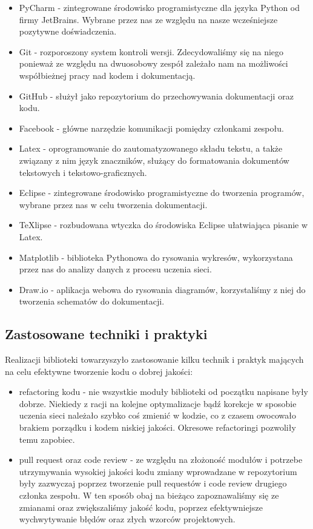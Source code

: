 \begin{itemize}
  \item PyCharm - zintegrowane środowisko programistyczne dla języka Python od firmy JetBrains.
  Wybrane przez nas ze względu na nasze wcześniejsze pozytywne doświadczenia.
  \item Git - rozporoszony system kontroli wersji. Zdecydowaliśmy się na niego ponieważ ze względu na 
  dwuosobowy zespół zależało nam na możliwości współbieżnej pracy nad kodem i dokumentacją.
  \item GitHub - służył jako repozytorium do przechowywania dokumentacji oraz kodu.
  \item Facebook - główne narzędzie komunikacji pomiędzy członkami zespołu.
  \item Latex - oprogramowanie do zautomatyzowanego składu tekstu, a także związany z nim język 
  znaczników, służący do formatowania dokumentów tekstowych i tekstowo-graficznych. 
  \item Eclipse - zintegrowane środowisko programistyczne do tworzenia programów, wybrane przez nas 
  w celu tworzenia dokumentacji.
  \item TeXlipse - rozbudowana wtyczka do środowiska Eclipse ułatwiająca pisanie w Latex.  
  \item Matplotlib - biblioteka Pythonowa do rysowania wykresów, wykorzystana przez nas do analizy danych 
  z procesu uczenia sieci. 
  \item Draw.io - aplikacja webowa do rysowania diagramów, korzystaliśmy z niej do tworzenia 
  schematów do dokumentacji.
\end{itemize}

\subsection{Zastosowane techniki i praktyki}
Realizacji biblioteki towarzyszyło zastosowanie kilku technik i praktyk mających na celu efektywne 
tworzenie kodu o dobrej jakości:
\begin{itemize}
  \item refactoring kodu - nie wszystkie moduły biblioteki od początku napisane były dobrze. Niekiedy z racji 
  na kolejne optymalizacje bądź korekcje w sposobie uczenia sieci należało szybko coś zmienić w kodzie,
  co z czasem owocowało brakiem porządku i kodem niskiej jakości. Okresowe refactoringi pozwoliły temu zapobiec.
  \item pull request oraz code review - ze względu na złożoność modułów i potrzebe utrzymywania wysokiej
  jakości kodu zmiany wprowadzane w repozytorium były zazwyczaj poprzez tworzenie pull requestów i code review
  drugiego członka zespołu. W ten sposób obaj na bieżąco zapoznawaliśmy się ze zmianami oraz zwiększaliśmy
  jakość kodu, poprzez efektywniejsze wychwytywanie błędów oraz złych wzorców projektowych.
\end{itemize}

